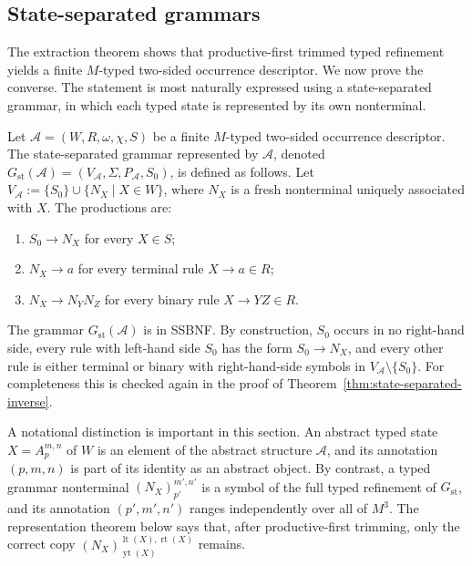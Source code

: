 \documentclass[sub]{jalc}
\newcommand{\yt}{\operatorname{yt}}
\newcommand{\lt}{\operatorname{lt}}
\newcommand{\rt}{\operatorname{rt}}
\begin{document}
\subsection{State-separated grammars}
\label{subsec:state-separated-grammar}

The extraction theorem shows that productive-first trimmed typed refinement yields a finite \(M\)-typed two-sided occurrence descriptor. We now prove the converse. The statement is most naturally expressed using a state-separated grammar, in which each typed state is represented by its own nonterminal.

\begin{definition}
\label{def:state-separated-grammar}
Let \(\mathcal A=(W,R,\omega,\chi,S)\) be a finite \(M\)-typed two-sided occurrence descriptor. The state-separated grammar represented by \(\mathcal A\), denoted \(G_{\mathrm{st}}(\mathcal A)=(V_{\mathcal A},\Sigma,P_{\mathcal A},S_0)\), is defined as follows. Let \(V_{\mathcal A}:=\{S_0\}\cup\{N_X\mid X\in W\}\), where \(N_X\) is a fresh nonterminal uniquely associated with \(X\). The productions are:
\begin{enumerate}[label=\textup{(\roman*)},leftmargin=2.2em]
\item \(S_0\to N_X\) for every \(X\in S\);
\item \(N_X\to a\) for every terminal rule \(X\to a\in R\);
\item \(N_X\to N_YN_Z\) for every binary rule \(X\to YZ\in R\).
\end{enumerate}
\end{definition}

The grammar \(G_{\mathrm{st}}(\mathcal A)\) is in SSBNF. By construction, \(S_0\) occurs in no right-hand side, every rule with left-hand side \(S_0\) has the form \(S_0\to N_X\), and every other rule is either terminal or binary with right-hand-side symbols in \(V_{\mathcal A}\setminus\{S_0\}\). For completeness this is checked again in the proof of Theorem~\ref{thm:state-separated-inverse}.

A notational distinction is important in this section. An abstract typed state \(X=A_p^{m,n}\) of \(W\) is an element of the abstract structure \(\mathcal A\), and its annotation \((p,m,n)\) is part of its identity as an abstract object. By contrast, a typed grammar nonterminal \((N_X)_{p'}^{m',n'}\) is a symbol of the full typed refinement of \(G_{\mathrm{st}}\), and its annotation \((p',m',n')\) ranges independently over all of \(M^3\). The representation theorem below says that, after productive-first trimming, only the correct copy \((N_X)_{\yt(X)}^{\lt(X),\rt(X)}\) remains.
\end{document}
